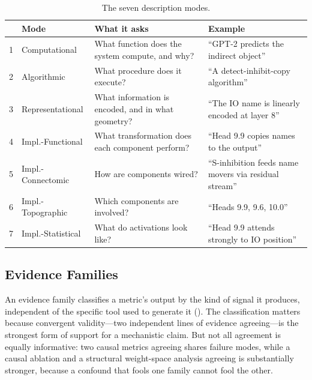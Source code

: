 \documentclass[10pt]{article}
\begin{document}
\begin{table}[H]
\centering
\small
\caption{The seven description modes.}
\label{tab:modes}
\renewcommand{\arraystretch}{1.2}
\begin{tabular}{@{}rl>{\raggedright\arraybackslash}p{4.8cm}>{\raggedright\arraybackslash}p{5.2cm}@{}}
\toprule
& \textbf{Mode} & \textbf{What it asks} & \textbf{Example} \\
\midrule
1 & Computational & What function does the system compute, and why? & ``GPT-2 predicts the indirect object'' \\
\midrule
2 & Algorithmic & What procedure does it execute? & ``A detect-inhibit-copy algorithm'' \\
\midrule
3 & Representational & What information is encoded, and in what geometry? & ``The IO name is linearly encoded at layer 8'' \\
\midrule
4 & Impl.-Functional & What transformation does each component perform? & ``Head 9.9 copies names to the output'' \\
\midrule
5 & Impl.-Connectomic & How are components wired? & ``S-inhibition feeds name movers via residual stream'' \\
\midrule
6 & Impl.-Topographic & Which components are involved? & ``Heads 9.9, 9.6, 10.0'' \\
\midrule
7 & Impl.-Statistical & What do activations look like? & ``Head 9.9 attends strongly to IO position'' \\
\bottomrule
\end{tabular}
\end{table}

\subsection{Evidence Families}
\label{sec:evidence-families}

An evidence family classifies a metric's output by the kind of signal it produces, independent of the specific tool used to generate it (). The classification matters because convergent validity---two independent lines of evidence agreeing---is the strongest form of support for a mechanistic claim. But not all agreement is equally informative: two causal metrics agreeing shares failure modes, while a causal ablation and a structural weight-space analysis agreeing is substantially stronger, because a confound that fools one family cannot fool the other.
\end{document}
